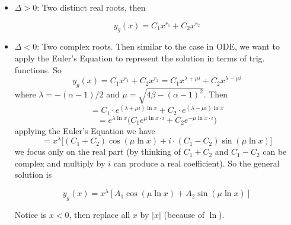 \documentclass[10pt]{article}
\newenvironment{changemargin}[2]{%
  \begin{list}{}{%
    \setlength{\topsep}{0pt}%
    \setlength{\leftmargin}{#1}%
    \setlength{\rightmargin}{#2}%
    \setlength{\listparindent}{\parindent}%
    \setlength{\itemindent}{\parindent}%
    \setlength{\parsep}{\parskip}%
  }%
  \item[]}{\end{list}}
\begin{document}
\begin{changemargin}{-0.125in}{0in}
\begin{enumerate}
     \begin{itemize}
     	\item $\Delta > 0$: Two distinct real roots, then 
        \begin{tcolorbox}[notitle,boxrule=0pt,colback=orange!20,colframe=blue!20]
     	\[
     	y_g(x) = C_1 x^{r_1} + C_2 x^{r_2}
     	\]
     	\end{tcolorbox}
        \item $\Delta < 0$: Two complex roots. Then similar to the case in ODE, we want to apply the Euler's Equation to represent the solution in terms of trig. functions. So 
        \[
        y_g(x) = C_1 x^{r_1} + C_2 x^{r_2} = C_1 x^{\lambda + \mu i} + C_2 x^{\lambda - \mu i}
        \]
        where $\lambda = -(\alpha -1)/2$ and $\mu = \sqrt{4\beta - (\alpha -1)^2}$. Then 
        \[
         = C_1 \cdot e^{(\lambda + \mu i)\ln x} + C_2 \cdot e^{(\lambda - \mu i)\ln x} 
        \]
        \[
         = e^{\lambda \ln x }\big(C_1 e^{\mu\ln x \cdot i} + C_2 e^{-\mu\ln x \cdot i}\big)
        \]
        applying the Euler's Equation we have 
        \[
         = x^\lambda \big[(C_1 + C_2)\cos(\mu \ln x) + i \cdot (C_1 - C_2)\sin (\mu \ln x)\big]
        \]
        we focus only on the real part (by thinking of $C_1 + C_2$ and $C_1 - C_2$ can be complex and multiply by $i$ can produce a real coefficient). So the general solution is 
        \begin{tcolorbox}[notitle,boxrule=0pt,colback=orange!20,colframe=blue!20]
        \[
        y_g(x) = x^\lambda [A_1 \cos(\mu \ln x) + A_2 \sin (\mu \ln x)]
        \]
        \end{tcolorbox}
        Notice is $x < 0$, then replace all $x$ by $|x|$ (because of $\ln$).
        
        \smallskip
        

\end{itemize}
\end{enumerate}
\end{changemargin}
\end{document}

